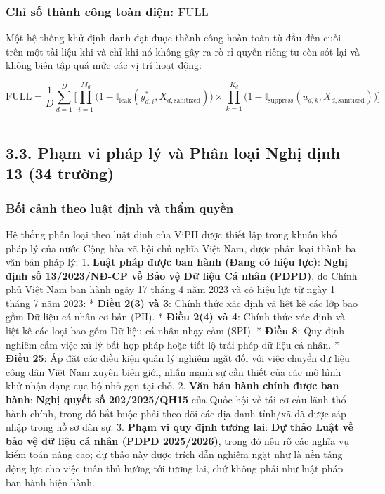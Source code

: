 \documentclass[
  11pt,
  a4paper,
]{article}
\begin{document}
\subsubsection{\texorpdfstring{Chỉ số thành công toàn diện:
\(\text{FULL}\)}{Chỉ số thành công toàn diện: \textbackslash text\{FULL\}}}\label{chux1ec9-sux1ed1-thuxe0nh-cuxf4ng-touxe0n-diux1ec7n-textfull}

Một hệ thống khử định danh đạt được thành công hoàn toàn từ đầu đến cuối
trên một tài liệu khi và chỉ khi nó không gây ra rò rỉ quyền riêng tư
còn sót lại và không biên tập quá mức các vị trí hoạt động:

\[\text{FULL} = \frac{1}{D} \sum_{d=1}^D \Biggl[ \prod_{i=1}^{M_d} \bigl(1 - \mathbb{I}_{\text{leak}}(y_{d,i}^*, X_{d,\text{sanitized}})\bigr) \times \prod_{k=1}^{K_d} \bigl(1 - \mathbb{I}_{\text{suppress}}(u_{d,k}, X_{d,\text{sanitized}})\bigr) \Biggr]\]

\begin{center}\rule{0.5\linewidth}{0.5pt}\end{center}

\subsection{3.3. Phạm vi pháp lý và Phân loại Nghị định 13 (34
trường)}\label{phux1ea1m-vi-phuxe1p-luxfd-vuxe0-phuxe2n-loux1ea1i-nghux1ecb-ux111ux1ecbnh-13-34-trux1b0ux1eddng}

\subsubsection{Bối cảnh theo luật định và thẩm
quyền}\label{bux1ed1i-cux1ea3nh-theo-luux1eadt-ux111ux1ecbnh-vuxe0-thux1ea9m-quyux1ec1n}

Hệ thống phân loại theo luật định của ViPII được thiết lập trong khuôn
khổ pháp lý của nước Cộng hòa xã hội chủ nghĩa Việt Nam, được phân loại
thành ba văn bản pháp lý: 1. \textbf{Luật pháp được ban hành (Đang có
hiệu lực)}: \textbf{Nghị định số 13/2023/NĐ-CP về Bảo vệ Dữ liệu Cá nhân
(PDPD)}, do Chính phủ Việt Nam ban hành ngày 17 tháng 4 năm 2023 và có
hiệu lực từ ngày 1 tháng 7 năm 2023: * \textbf{Điều 2(3) và 3}: Chính
thức xác định và liệt kê các lớp bao gồm Dữ liệu cá nhân cơ bản
(\(\text{PII}\)). * \textbf{Điều 2(4) và 4}: Chính thức xác định và liệt
kê các loại bao gồm Dữ liệu cá nhân nhạy cảm (\(\text{SPI}\)). *
\textbf{Điều 8}: Quy định nghiêm cấm việc xử lý bất hợp pháp hoặc tiết
lộ trái phép dữ liệu cá nhân. * \textbf{Điều 25}: Áp đặt các điều kiện
quản lý nghiêm ngặt đối với việc chuyển dữ liệu công dân Việt Nam xuyên
biên giới, nhấn mạnh sự cần thiết của các mô hình khử nhận dạng cục bộ
nhỏ gọn tại chỗ. 2. \textbf{Văn bản hành chính được ban hành}:
\textbf{Nghị quyết số 202/2025/QH15} của Quốc hội về tái cơ cấu lãnh thổ
hành chính, trong đó bắt buộc phải theo dõi các địa danh tỉnh/xã đã được
sáp nhập trong hồ sơ dân sự. 3. \textbf{Phạm vi quy định tương lai}:
\textbf{Dự thảo Luật về bảo vệ dữ liệu cá nhân (PDPD 2025/2026)}, trong
đó nêu rõ các nghĩa vụ kiểm toán nâng cao; dự thảo này được trích dẫn
nghiêm ngặt như là nền tảng động lực cho việc tuân thủ hướng tới tương
lai, chứ không phải như luật pháp ban hành hiện hành.
\end{document}
